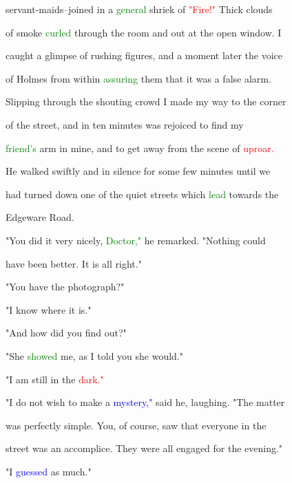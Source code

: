  servant-maids--joined in a \textcolor{green}{general} \textcolor{BurntOrange}{shriek} of \textcolor{red}{"Fire!"} Thick clouds

 of smoke \textcolor{green}{curled} through the room and out at the open window. I

 caught a glimpse of rushing figures, and a moment later the voice

 of Holmes from within \textcolor{green}{assuring} them that it was a false \textcolor{BurntOrange}{alarm.}

 \textcolor{BurntOrange}{Slipping} through the \textcolor{BurntOrange}{shouting} crowd I made my way to the corner

 of the street, and in ten minutes was \textcolor{BurntOrange}{rejoiced} to find my

 \textcolor{green}{friend's} arm in mine, and to get away from the scene of \textcolor{red}{uproar.}

 He walked swiftly and in silence for some few minutes until we

 had turned down one of the \textcolor{BurntOrange}{quiet} streets which \textcolor{green}{lead} towards the

 Edgeware Road.



 "You did it very nicely, \textcolor{green}{Doctor,"} he remarked. "Nothing could

 have been better. It is all right."



 "You have the photograph?"



 "I know where it is."



 "And how did you find out?"



 "She \textcolor{green}{showed} me, as I told you she would."



 "I am still in the \textcolor{red}{dark."}



 "I do not wish to make a \textcolor{blue}{mystery,"} said he, \textcolor{BurntOrange}{laughing.} "The matter

 was perfectly simple. You, of course, saw that everyone in the

 street was an accomplice. They were all engaged for the evening."



 "I \textcolor{blue}{guessed} as much."



